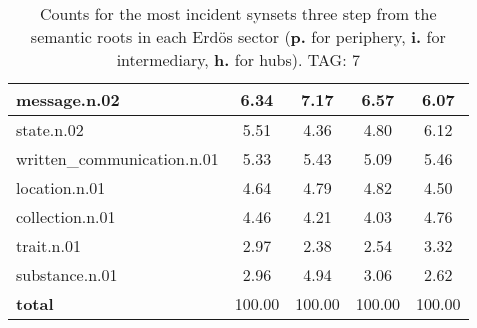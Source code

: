 \begin{table}[h!]
\begin{center}
\begin{tabular}{| l || c | c | c | c |}
message.n.02 & 6.34  & 7.17  & 6.57  & 6.07 \\\hline
state.n.02 & 5.51  & 4.36  & 4.80  & 6.12 \\\hline
written\_communication.n.01 & 5.33  & 5.43  & 5.09  & 5.46 \\\hline
location.n.01 & 4.64  & 4.79  & 4.82  & 4.50 \\\hline
collection.n.01 & 4.46  & 4.21  & 4.03  & 4.76 \\\hline
trait.n.01 & 2.97  & 2.38  & 2.54  & 3.32 \\\hline
substance.n.01 & 2.96  & 4.94  & 3.06  & 2.62 \\\hline\hline
{{\bf total}} & 100.00  & 100.00  & 100.00  & 100.00 \\\hline
\end{tabular}
\caption{Counts for the most incident synsets three step from the semantic roots in each Erd\"os sector ({\bf p.} for periphery, {\bf i.} for intermediary, {\bf h.} for hubs). TAG: 7}
\end{center}
\end{table}